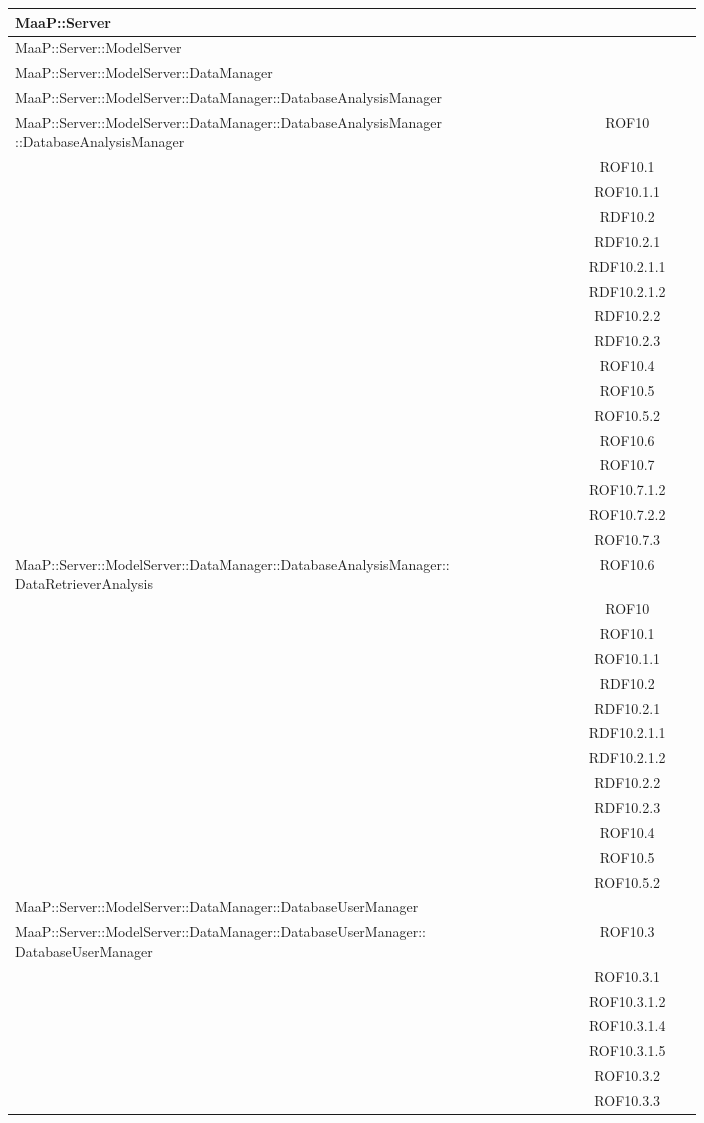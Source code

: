 \begin{center}
\begin{longtable}{|p{0.8\linewidth}|c|}
\midrule
MaaP::Server
& \\

\midrule
MaaP::Server::ModelServer
& \\

\midrule
MaaP::Server::ModelServer::DataManager
& \\

\midrule
MaaP::Server::ModelServer::DataManager::DatabaseAnalysisManager
& \\

\midrule
MaaP::Server::ModelServer::DataManager::DatabaseAnalysisManager ::DatabaseAnalysisManager
& ROF10\\
& ROF10.1\\
& ROF10.1.1\\
& RDF10.2\\
& RDF10.2.1\\
& RDF10.2.1.1\\
& RDF10.2.1.2\\
& RDF10.2.2\\
& RDF10.2.3\\
& ROF10.4\\
& ROF10.5\\
& ROF10.5.2\\
& ROF10.6\\
& ROF10.7\\
& ROF10.7.1.2\\
& ROF10.7.2.2\\
& ROF10.7.3\\

\midrule
MaaP::Server::ModelServer::DataManager::DatabaseAnalysisManager:: DataRetrieverAnalysis
& ROF10.6\\
& ROF10\\
& ROF10.1\\
& ROF10.1.1\\
& RDF10.2\\
& RDF10.2.1\\
& RDF10.2.1.1\\
& RDF10.2.1.2\\
& RDF10.2.2\\
& RDF10.2.3\\
& ROF10.4\\
& ROF10.5\\
& ROF10.5.2\\

\midrule
MaaP::Server::ModelServer::DataManager::DatabaseUserManager
& \\

\midrule
MaaP::Server::ModelServer::DataManager::DatabaseUserManager:: DatabaseUserManager
& ROF10.3\\
& ROF10.3.1\\
& ROF10.3.1.2\\
& ROF10.3.1.4\\
& ROF10.3.1.5\\
& ROF10.3.2\\
& ROF10.3.3\\



\end{longtable}
\end{center}
